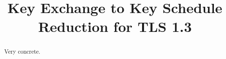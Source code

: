 \documentclass[hyperref,envcountsame,envcountsect,runningheads]{llncs}%
\title{Key Exchange to Key Schedule\\Reduction for TLS 1.3}
\author{}\institute{}
\begin{document}
\maketitle
\vspace{-1.3cm}

\newcommand\pink{\textcolor{kxpink}{pink}}
\newcommand\blue{\textcolor{kxblue}{blue}}
\newcommand\gray{\textcolor{gray}{gray}}

\begin{abstract}
Very concrete.
\end{abstract}




%

%
%
%




{}



\tableofcontents

\clearpage

\appendix
\end{document}
